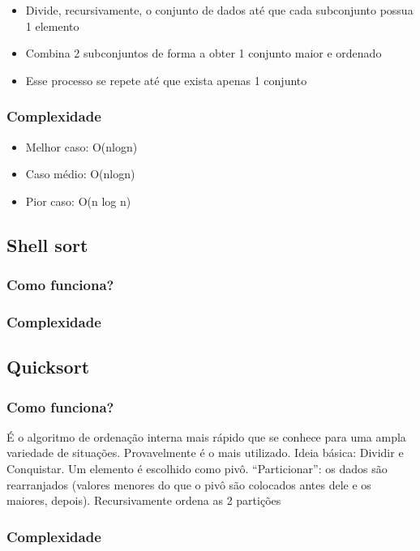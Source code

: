 \documentclass{report}
\begin{document}
	\begin{itemize}
		\item Divide, recursivamente, o conjunto de dados até que cada subconjunto possua 1 elemento
		\item Combina 2 subconjuntos de forma a obter 1 conjunto maior e ordenado
		\item Esse processo se repete até que exista apenas 1 conjunto
	\end{itemize}
	\subsubsection{Complexidade}
	\begin{itemize}
		\item Melhor caso: O(nlogn)
		\item Caso médio: O(nlogn)
		\item Pior caso: O(n log n)
	\end{itemize} 
	\subsection{Shell sort}
	\subsubsection{Como funciona?}
	\subsubsection{Complexidade}

	\subsection{Quicksort}
	\subsubsection{Como funciona?}
	
	É o algoritmo de ordenação interna mais rápido que se conhece para uma ampla variedade de situações. Provavelmente é o mais utilizado. Ideia básica: Dividir e Conquistar. Um elemento é escolhido como pivô. “Particionar”: os dados são rearranjados (valores menores do que o pivô são colocados antes dele e os maiores, depois). Recursivamente ordena as 2 partições
	\subsubsection{Complexidade}
	
\end{document}
